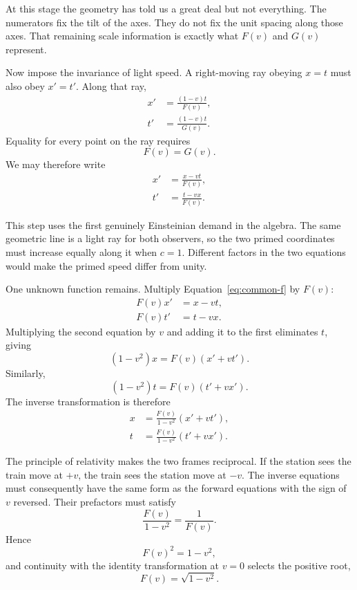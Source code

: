 At this stage the geometry has told us a great deal but not everything. The numerators fix the tilt of the axes. They do not fix the unit spacing along those axes. That remaining scale information is exactly what \(F(v)\) and \(G(v)\) represent.

Now impose the invariance of light speed. A right-moving ray obeying \(x=t\) must also obey \(x'=t'\). Along that ray,
\begin{align}
x'&=\frac{(1-v)t}{F(v)},\\
t'&=\frac{(1-v)t}{G(v)}.
\end{align}
Equality for every point on the ray requires
\begin{equation}
F(v)=G(v).
\end{equation}
We may therefore write
\begin{align}
x'&=\frac{x-vt}{F(v)},\\
t'&=\frac{t-vx}{F(v)}.
\label{eq:common-f}
\end{align}

This step uses the first genuinely Einsteinian demand in the algebra. The same geometric line is a light ray for both observers, so the two primed coordinates must increase equally along it when \(c=1\). Different factors in the two equations would make the primed speed differ from unity.

One unknown function remains. Multiply Equation~\eqref{eq:common-f} by \(F(v)\):
\begin{align}
F(v)x'&=x-vt,\\
F(v)t'&=t-vx.
\end{align}
Multiplying the second equation by \(v\) and adding it to the first eliminates \(t\), giving
\begin{equation}
(1-v^2)x=F(v)(x'+vt').
\end{equation}
Similarly,
\begin{equation}
(1-v^2)t=F(v)(t'+vx').
\end{equation}
The inverse transformation is therefore
\begin{align}
x&=\frac{F(v)}{1-v^2}(x'+vt'),\\
t&=\frac{F(v)}{1-v^2}(t'+vx').
\end{align}

The principle of relativity makes the two frames reciprocal. If the station sees the train move at \(+v\), the train sees the station move at \(-v\). The inverse equations must consequently have the same form as the forward equations with the sign of \(v\) reversed. Their prefactors must satisfy
\begin{equation}
\frac{F(v)}{1-v^2}=\frac{1}{F(v)}.
\end{equation}
Hence
\begin{equation}
F(v)^2=1-v^2,
\end{equation}
and continuity with the identity transformation at \(v=0\) selects the positive root,
\begin{equation}
F(v)=\sqrt{1-v^2}.
\end{equation}

